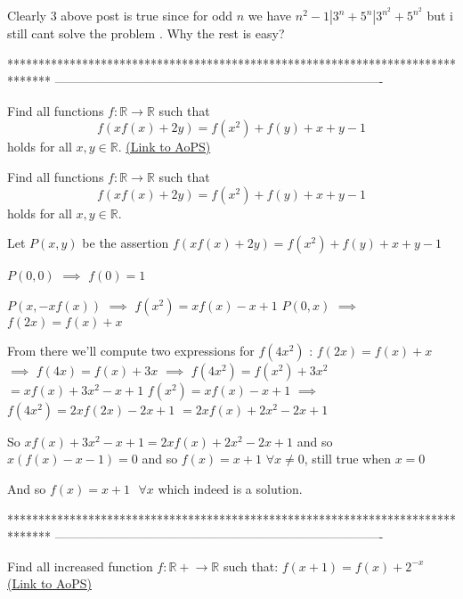 \begin{solution}
	Clearly 3 above post is true since for odd $n$ we have $n^2-1|3^n+5^n|3^{n^2}+5^{n^2}$ but i still
cant solve the problem . Why the rest is easy?
\end{solution}
*******************************************************************************
-------------------------------------------------------------------------------

\begin{problem}
	Find all functions $ f : \mathbb{R} \rightarrow \mathbb{R} $ such that
\[ f( xf(x) + 2y) = f(x^2)+f(y)+x+y-1 \]
holds for all $ x, y \in \mathbb{R}$.
	\flushright \href{https://artofproblemsolving.com/community/c6h589872}{(Link to AoPS)}
\end{problem}



\begin{solution}
	\begin{tcolorbox}Find all functions $ f : \mathbb{R} \rightarrow \mathbb{R} $ such that
\[ f( xf(x) + 2y) = f(x^2)+f(y)+x+y-1 \]
holds for all $ x, y \in \mathbb{R}$.\end{tcolorbox}
Let $P(x,y)$ be the assertion $f(xf(x)+2y)=f(x^2)+f(y)+x+y-1$ 

$P(0,0)$ $\implies$ $f(0)=1$

$P(x,-xf(x))$ $\implies$ $f(x^2)=xf(x)-x+1$
$P(0,x)$ $\implies$ $f(2x)=f(x)+x$

From there we'll compute two expressions for $f(4x^2)$ :
$f(2x)=f(x)+x$ $\implies$ $f(4x)=f(x)+3x$ $\implies$ $f(4x^2)=f(x^2)+3x^2$ $=xf(x)+3x^2-x+1$
$f(x^2)=xf(x)-x+1$ $\implies$ $f(4x^2)=2xf(2x)-2x+1$ $=2xf(x)+2x^2-2x+1$

So $xf(x)+3x^2-x+1=2xf(x)+2x^2-2x+1$ and so $x(f(x)-x-1)=0$ and so $f(x)=x+1$ $\forall x\ne 0$, still true when $x=0$

And so $\boxed{f(x)=x+1\text{   }\forall x}$ which indeed is a solution.
\end{solution}
*******************************************************************************
-------------------------------------------------------------------------------

\begin{problem}
	Find all increased function $f: \mathbb{R+} \rightarrow \mathbb{R}$ such that:
$f(x+1) = f(x) + 2^{-x}$
	\flushright \href{https://artofproblemsolving.com/community/c6h590142}{(Link to AoPS)}
\end{problem}



